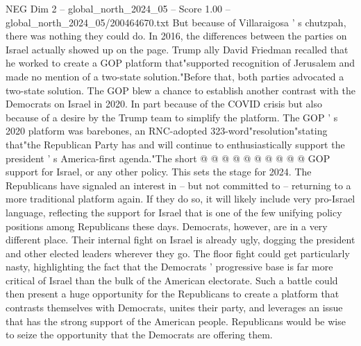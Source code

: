 \begin{textsample}{NEG Dim 2 – global\_north\_2024\_05 – Score 1.00 – global\_north\_2024\_05/200464670.txt}
But because of Villaraigosa ' s chutzpah, there was nothing they could do.
In 2016, the differences between the parties on Israel actually showed up on the page.
Trump ally David Friedman recalled that he worked to create a GOP platform that"supported recognition of Jerusalem and made no mention of a two-state solution."Before that, both parties advocated a two-state solution.
The GOP blew a chance to establish another contrast with the Democrats on Israel in 2020.
In part because of the COVID crisis but also because of a desire by the Trump team to simplify the platform.
The GOP ' s 2020 platform was barebones, an RNC-adopted 323-word"resolution"stating that"the Republican Party has and will continue to enthusiastically support the president ' s America-first agenda."The short @ @ @ @ @ @ @ @ @ @ GOP support for Israel, or any other policy.
This sets the stage for 2024.
The Republicans have signaled an interest in -- but not committed to -- returning to a more traditional platform again.
If they do so, it will likely include very pro-Israel language, reflecting the support for Israel that is one of the few unifying policy positions among Republicans these days.
Democrats, however, are in a very different place.
Their internal fight on Israel is already ugly, dogging the president and other elected leaders wherever they go.
The floor fight could get particularly nasty, highlighting the fact that the Democrats ' progressive base is far more critical of Israel than the bulk of the American electorate.
Such a battle could then present a huge opportunity for the Republicans to create a platform that contrasts themselves with Democrats, unites their party, and leverages an issue that has the strong support of the American people.
Republicans would be wise to seize the opportunity that the Democrats are offering them.

\end{textsample}

